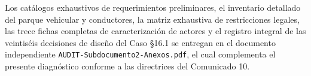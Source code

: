\noindent Los catálogos exhaustivos de requerimientos preliminares, el inventario detallado del parque vehicular y conductores, la matriz exhaustiva de restricciones legales, las trece fichas completas de caracterización de actores y el registro integral de las veintiséis decisiones de diseño del Caso §16.1 se entregan en el documento independiente \texttt{AUDIT-Subdocumento2-Anexos.pdf}, el cual complementa el presente diagnóstico conforme a las directrices del Comunicado 10.

\nocite{bases-fep01, bases-fep02, bases-fep03, bases-com10, ley20123, codigo_trabajo_25bis, ley21719, ley21377, glec2023, iso14083, ds298, ds43minsal, ds158mop}
